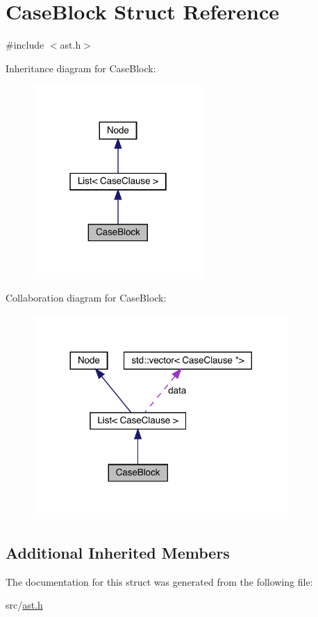 \hypertarget{struct_case_block}{}\section{Case\+Block Struct Reference}
\label{struct_case_block}


{\ttfamily \#include $<$ast.\+h$>$}



Inheritance diagram for Case\+Block\+:
\nopagebreak
\begin{figure}[H]
\begin{center}
\leavevmode
\includegraphics[width=183pt]{struct_case_block__inherit__graph}
\end{center}
\end{figure}


Collaboration diagram for Case\+Block\+:
\nopagebreak
\begin{figure}[H]
\begin{center}
\leavevmode
\includegraphics[width=276pt]{struct_case_block__coll__graph}
\end{center}
\end{figure}
\subsection*{Additional Inherited Members}


The documentation for this struct was generated from the following file\+:\begin{DoxyCompactItemize}
\item 
src/\hyperlink{ast_8h}{ast.\+h}\end{DoxyCompactItemize}
